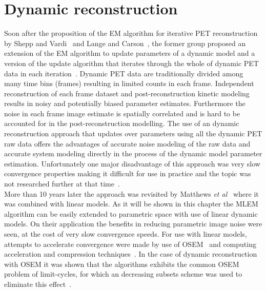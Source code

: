 \section{Dynamic reconstruction}
\label{section:Fully_4D_reconstruction}
Soon after the proposition of the EM algorithm for iterative PET reconstruction by Shepp and Vardi~\cite{Vardi1985} and Lange and Carson~\cite{Lange1984}, the former group proposed an extension of the EM algorithm to update parameters of a dynamic model and a version of the update algorithm that iterates through the whole of dynamic PET data in each iteration~\cite{Carson1985}. Dynamic PET data are traditionally divided among many time bins (frames) resulting in limited counts in each frame. Independent reconstruction of each frame dataset and post-reconstruction kinetic modeling results in noisy and potentially biased parameter estimates. Furthermore the noise in each frame image estimate is spatially correlated and is hard to be accounted for in the post-reconstruction modelling. The use of an dynamic reconstruction approach that updates over parameters using all the dynamic PET raw data offers the advantages of accurate noise modeling of the raw data and accurate system modeling directly in the process of the dynamic model parameter estimation. Unfortunately one major disadvantage of this approach was very slow convergence properties making it difficult for use in practice and the topic was not researched further at that time~\cite{Carson1985}. \\
More than 10 years later the approach was revisited by Matthews \textit{et al}~\cite{Matthews1995} where it was combined with linear models. As it will be shown in this chapter the MLEM algorithm can be easily extended to parametric space with use of linear dynamic models. On their application the benefits in reducing parametric image noise were seen, at the cost of very slow convergence speeds. For use with linear models, attempts to accelerate convergence were made by use of OSEM~\cite{Tsoumpas2008} and computing acceleration and compression techniques~\cite{Hong2008}. In the case of dynamic reconstruction with OSEM it was shown that the algorithms exhibits the common OSEM problem of limit-cycles, for which an decreasing subsets scheme was used to eliminate this effect~\cite{Angelis2011}. \\
